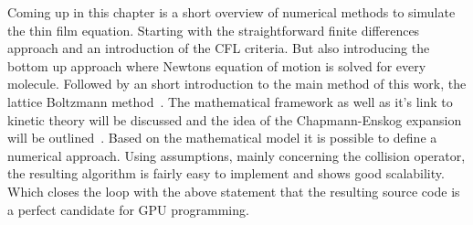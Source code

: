 Coming up in this chapter is a short overview of numerical methods to simulate the thin film equation.
Starting with the straightforward finite differences approach and an introduction of the CFL criteria.
But also introducing the bottom up approach where Newtons equation of motion is solved for every molecule.
Followed by an short introduction to the main method of this work, the lattice Boltzmann method~\cite{PhysRevLett.56.1505, krueger2017, succi}. 
The mathematical framework as well as it's link to kinetic theory will be discussed and the idea of the Chapmann-Enskog expansion will be outlined~\cite{Chapman, Enskog}. 
Based on the mathematical model it is possible to define a numerical approach.
Using assumptions, mainly concerning the collision operator, the resulting algorithm is fairly easy to implement and shows good scalability.
Which closes the loop with the above statement that the resulting source code is a perfect candidate for GPU programming.


